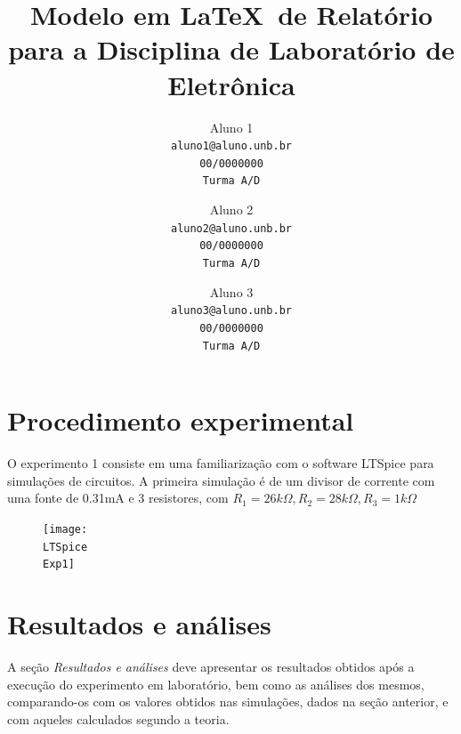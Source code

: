 \documentclass[10pt,twocolumn,letterpaper]{article}
\begin{document}
\title{Modelo em \LaTeX\ de Relatório para a Disciplina de Laboratório de Eletrônica}

\author{Aluno 1\\
{\tt\small aluno1@aluno.unb.br}\\
{\tt\small 00/0000000}\\
{\tt\small Turma A/D}
\and
Aluno 2\\
{\tt\small aluno2@aluno.unb.br}\\
{\tt\small 00/0000000}\\
{\tt\small Turma A/D}
\and
Aluno 3\\
{\tt\small aluno3@aluno.unb.br}\\
{\tt\small 00/0000000}\\
{\tt\small Turma A/D}
}

\maketitle
\section{Procedimento experimental}

O experimento 1 consiste em uma familiarização com o software LTSpice para simulações de circuitos. A primeira simulação é de um divisor de corrente com uma fonte de 0.31mA e 3 resistores, com $R_1 = 26k\Omega, R_2 = 28k\Omega, R_3 = 1k\Omega$

\begin{figure}
\texttt{[image: \\LTSpice\\Exp1]}
\end{figure}
\section{Resultados e análises}

A seção {\em Resultados e análises} deve apresentar os resultados obtidos após a execução do experimento em laboratório, bem como as análises dos mesmos, comparando-os com os valores obtidos nas simulações, dados na seção anterior, e com aqueles calculados segundo a teoria.  

\end{document}
